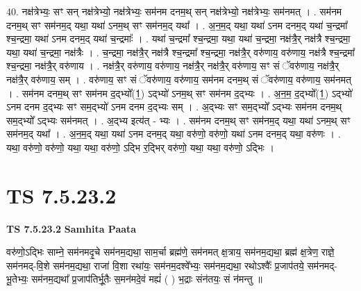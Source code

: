 \documentclass[17pt]{extarticle}
\begin{document}
40. नक्ष॑त्रेभ्यः॒ सꣳ सन् नक्ष॑त्रेभ्यो॒ नक्ष॑त्रेभ्यः॒ सम॑नम दनम॒थ् सन् नक्ष॑त्रेभ्यो॒ नक्ष॑त्रेभ्यः॒ सम॑नमत् । . सम॑नम दनम॒थ् सꣳ सम॑नम॒द् यथा॒ यथा॑ ऽनम॒थ् सꣳ सम॑नम॒द् यथा᳚ । . अ॒न॒म॒द् यथा॒ यथा॑ ऽनम दनम॒द् यथा॑ च॒न्द्रमा᳚ श्च॒न्द्रमा॒ यथा॑ ऽनम दनम॒द् यथा॑ च॒न्द्रमाः᳚ । . यथा॑ च॒न्द्रमा᳚ श्च॒न्द्रमा॒ यथा॒ यथा॑ च॒न्द्रमा॒ नक्ष॑त्रै॒र् नक्ष॑त्रै श्च॒न्द्रमा॒ यथा॒ यथा॑ च॒न्द्रमा॒ नक्ष॑त्रैः । . च॒न्द्रमा॒ नक्ष॑त्रै॒र् नक्ष॑त्रै श्च॒न्द्रमा᳚ श्च॒न्द्रमा॒ नक्ष॑त्रै॒र् वरु॑णाय॒ वरु॑णाय॒ नक्ष॑त्रै श्च॒न्द्रमा᳚ श्च॒न्द्रमा॒ नक्ष॑त्रै॒र् वरु॑णाय । . नक्ष॑त्रै॒र् वरु॑णाय॒ वरु॑णाय॒ नक्ष॑त्रै॒र् नक्ष॑त्रै॒र् वरु॑णाय॒ सꣳ सं ॅवरु॑णाय॒ नक्ष॑त्रै॒र् नक्ष॑त्रै॒र् वरु॑णाय॒ सम् । . वरु॑णाय॒ सꣳ सं ॅवरु॑णाय॒ वरु॑णाय॒ सम॑नम दनम॒थ् सं ॅवरु॑णाय॒ वरु॑णाय॒ सम॑नमत् । . सम॑नम दनम॒थ् सꣳ सम॑नम द॒द्भ्यो᳚(1॒) ऽद्भ्यो॑ ऽनम॒थ् सꣳ सम॑नम द॒द्भ्यः । . अ॒न॒म॒ द॒द्भ्यो᳚(1॒) ऽद्भ्यो॑ ऽनम दनम द॒द्भ्यः सꣳ सम॒द्भ्यो॑ ऽनम दनम द॒द्भ्यः सम् । . अ॒द्भ्यः सꣳ सम॒द्भ्यो᳚ ऽद्भ्यः सम॑नम दनम॒थ् सम॒द्भ्यो᳚ ऽद्भ्यः सम॑नमत् । . अ॒द्भ्य इत्य॑त् - भ्यः । . सम॑नम दनम॒थ् सꣳ सम॑नम॒द् यथा॒ यथा॑ ऽनम॒थ् सꣳ सम॑नम॒द् यथा᳚ । . अ॒न॒म॒द् यथा॒ यथा॑ ऽनम दनम॒द् यथा॒ वरु॑णो॒ वरु॑णो॒ यथा॑ ऽनम दनम॒द् यथा॒ वरु॑णः । . यथा॒ वरु॑णो॒ वरु॑णो॒ यथा॒ यथा॒ वरु॑णो॒ ऽद्भि र॒द्भिर् वरु॑णो॒ यथा॒ यथा॒ वरु॑णो॒ ऽद्भिः । \newline
\pagebreak
{}

\section{ TS 7.5.23.2 }

\textbf{TS 7.5.23.2 } \newline
\textbf{Samhita Paata} \newline

वरु॑णो॒ऽद्भिः साम्ने॒ सम॑नमदृ॒चे सम॑नम॒द्यथा॒ साम॒र्चा ब्रह्म॑णे॒ सम॑नमत् क्ष॒त्राय॒ सम॑नम॒द्यथा॒ ब्रह्म॑ क्ष॒त्रेण॒ राज्ञे॒ सम॑नमद्-वि॒शे सम॑नम॒द्यथा॒ राजा॑ वि॒शा रथा॑यः॒ सम॑नम॒दश्वे᳚भ्यः॒ सम॑नम॒द्यथा॒ रथोऽश्वैः᳚ प्र॒जाप॑तये॒ सम॑नमद्-भू॒तेभ्यः॒ सम॑नम॒द्यथा᳚ प्र॒जाप॑तिर्भू॒तैः स॒मन॑मदे॒वं मह्यं॑ ( ) भ॒द्राः संन॑तयः॒ सं न॑मन्तु ॥ \newline
\end{document}
